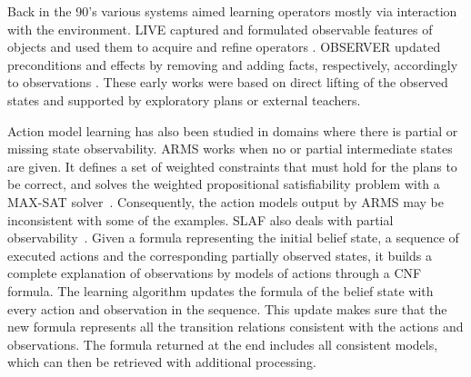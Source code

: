 \documentclass[letterpaper]{article} %
\newcommand{\strips}{\textsc{Strips}}     %
\begin{document}
Back in the 90's various systems aimed learning operators mostly via interaction with the environment. {\sc LIVE} captured and formulated observable features of objects and used them to acquire and refine operators \cite{ShenS89}. {\sc OBSERVER} updated preconditions and effects by removing and adding facts, respectively, accordingly to observations \cite{Wang95learningby}. These early works were based on direct lifting of the observed states and supported by exploratory plans or external teachers.%


Action model learning has also been studied in domains where there is partial or missing state observability. {\sf ARMS} works when no or partial intermediate states are given. It defines a set of weighted constraints that must hold for the plans to be correct, and solves the weighted propositional satisfiability problem with a MAX-SAT solver~\cite{yang2007learning}. Consequently, the action models output by {\sf ARMS} may be inconsistent with some of the examples. {\sc SLAF} also deals with partial observability~\cite{amir:alearning:JAIR08}. Given a formula representing the initial belief state, a sequence of executed actions and the corresponding partially observed states, it builds a complete explanation of observations by models of actions through a CNF formula. The learning algorithm updates the formula of the belief state with every action and observation in the sequence. This update makes sure that the new formula represents all the transition relations consistent with the actions and observations. The formula returned at the end includes all consistent models, which can then be retrieved with additional processing.

\end{document}
